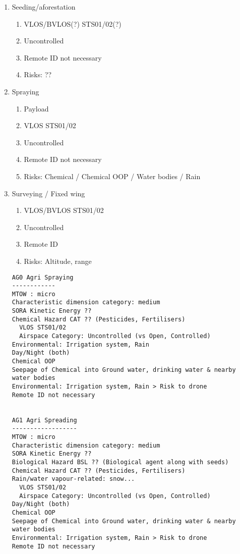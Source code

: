 \documentclass{ua_wgs_base}
\begin{document}
\begin{enumerate}

   \item Seeding/aforestation

\begin{enumerate}
   \item VLOS/BVLOS(?) STS01/02(?)
   \item Uncontrolled
   \item Remote ID not necessary
   \item Risks: ??
\end{enumerate}
   \item Spraying
\begin{enumerate}
         \item Payload 
         \item VLOS STS01/02
         \item Uncontrolled
         \item Remote ID not necessary
         \item Risks: Chemical / Chemical OOP / Water bodies / Rain
\end{enumerate}
         \item Surveying / Fixed wing
\begin{enumerate}
  \item VLOS/BVLOS STS01/02
  \item Uncontrolled
  \item Remote ID
  \item Risks: Altitude, range
\end{enumerate}

    \begin{verbatim}
AG0 Agri Spraying
------------
MTOW : micro
Characteristic dimension category: medium
SORA Kinetic Energy ??
Chemical Hazard CAT ?? (Pesticides, Fertilisers)
  VLOS STS01/02
  Airspace Category: Uncontrolled (vs Open, Controlled)
Environmental: Irrigation system, Rain
Day/Night (both)
Chemical OOP 
Seepage of Chemical into Ground water, drinking water & nearby water bodies
Environmental: Irrigation system, Rain > Risk to drone
Remote ID not necessary


AG1 Agri Spreading
------------------
MTOW : micro
Characteristic dimension category: medium
SORA Kinetic Energy ??
Biological Hazard BSL ?? (Biological agent along with seeds)
Chemical Hazard CAT ?? (Pesticides, Fertilisers)
Rain/water vapour-related: snow... 
  VLOS STS01/02
  Airspace Category: Uncontrolled (vs Open, Controlled)
Day/Night (both)
Chemical OOP 
Seepage of Chemical into Ground water, drinking water & nearby water bodies
Environmental: Irrigation system, Rain > Risk to drone
Remote ID not necessary


\end{verbatim}
\end{enumerate}
\end{document}
